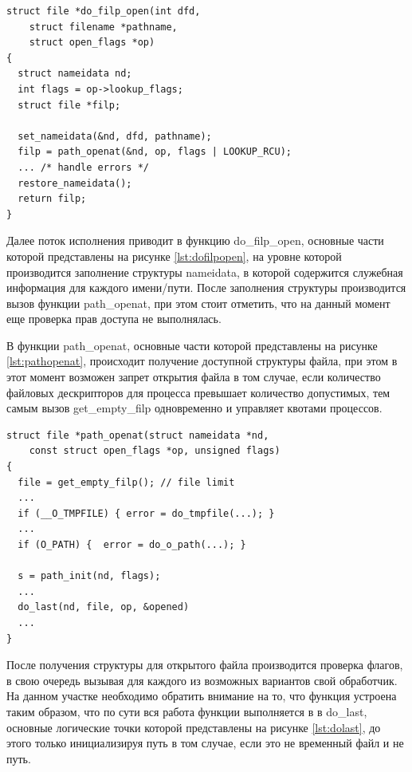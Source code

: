 \documentclass{gost7.32-2001}
\begin{document}
\begin{lstlisting}[caption={Ключевые особенности функции do\_filp\_open},
    captionpos=b, float, label={lst:dofilpopen}]
struct file *do_filp_open(int dfd,
    struct filename *pathname,
    struct open_flags *op)
{
  struct nameidata nd;
  int flags = op->lookup_flags;
  struct file *filp;

  set_nameidata(&nd, dfd, pathname);
  filp = path_openat(&nd, op, flags | LOOKUP_RCU);
  ... /* handle errors */
  restore_nameidata();
  return filp;
}
\end{lstlisting}

Далее поток исполнения приводит в функцию do\_filp\_open, основные
части которой представлены на рисунке \ref{lst:dofilpopen}, на уровне
которой производится заполнение структуры nameidata, в которой
содержится служебная информация для каждого имени/пути. После
заполнения структуры производится вызов функции path\_openat, при этом
стоит отметить, что на данный момент еще проверка прав доступа не
выполнялась.

В функции path\_openat, основные части которой представлены на
рисунке \ref{lst:pathopenat}, происходит получение доступной
структуры файла, при этом в этот момент возможен запрет открытия файла
в том случае, если количество файловых дескрипторов для процесса
превышает количество допустимых, тем самым вызов get\_empty\_filp
одновременно и управляет квотами процессов.

\begin{lstlisting}[caption={Ключевые особенности функции path\_openat},
    captionpos=b, float, label={lst:pathopenat}]
struct file *path_openat(struct nameidata *nd,
    const struct open_flags *op, unsigned flags)
{
  file = get_empty_filp(); // file limit
  ...
  if (__O_TMPFILE) { error = do_tmpfile(...); }
  ...
  if (O_PATH) {  error = do_o_path(...); }

  s = path_init(nd, flags);
  ...
  do_last(nd, file, op, &opened)
  ...
}
\end{lstlisting}

После получения структуры для открытого файла производится проверка
флагов, в свою очередь вызывая для каждого из возможных вариантов свой
обработчик. На данном участке необходимо обратить внимание на то, что
функция устроена таким образом, что по сути вся работа функции
выполняется в в do\_last, основные логические точки которой
представлены на рисунке \ref{lst:dolast}, до этого только
инициализируя путь в том случае, если это не временный файл и не путь.
\end{document}
